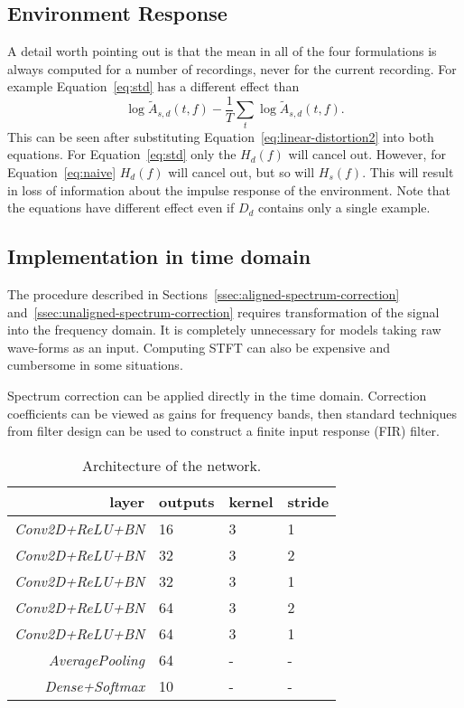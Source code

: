 \documentclass[a4paper]{article}
\newcommand{\va}{A}
\newcommand{\vh}{H}
\newcommand{\vs}{s}
\newcommand{\ff}{f}
\newcommand{\dd}{d}
\newcommand{\ampltf}[1]{\widetilde{\va}_{#1}\left(t,\ff\right)}
\newcommand{\respf}[1]{\vh_{#1}\left(\ff\right)}
\begin{document}
\subsection{Environment Response}
\label{ssec:env-resp}

A detail worth pointing out is that the mean in all of the four formulations is always computed for a number of recordings, never for the current recording. For example Equation~\eqref{eq:std} has a different effect than
\begin{equation}
    \log\ampltf{\vs,\dd} - \frac{1}{T}\sum_{t}\log\ampltf{\vs,\dd}.
    \label{eq:naive}
\end{equation}
This can be seen after substituting Equation~\eqref{eq:linear-distortion2} into both equations. 
For Equation~\eqref{eq:std} only the $\respf{\dd}$ will cancel out. However, for Equation~\eqref{eq:naive} $\respf{\dd}$ will cancel out, but so will $\respf{\vs}$.
This will result in loss of information about the impulse response of the environment.
Note that the equations have different effect even if $D_\dd$ contains only a single example.

\subsection{Implementation in time domain}
\label{ssec:fir}

The procedure described in Sections~\ref{ssec:aligned-spectrum-correction} and~\ref{ssec:unaligned-spectrum-correction} requires transformation of the signal into the frequency domain. It is completely unnecessary for models taking raw wave-forms as an input. Computing STFT can also be expensive and cumbersome in some situations.

Spectrum correction can be applied directly in the time domain. Correction coefficients can be viewed as gains for frequency bands, then standard techniques from filter design can be used to construct a finite input response (FIR) filter.

\begin{table}[t]
\centering
\caption{Architecture of the network.}
\begin{tabular}{@{}rlll@{}}
\toprule
\textbf{layer} & \textbf{outputs} & \textbf{kernel} & \textbf{stride} \\ \midrule
\textit{Conv2D+ReLU+BN} & 16 & 3 & 1 \\
\textit{Conv2D+ReLU+BN} & 32 & 3 & 2 \\
\textit{Conv2D+ReLU+BN} & 32 & 3 & 1 \\
\textit{Conv2D+ReLU+BN} & 64 & 3 & 2 \\
\textit{Conv2D+ReLU+BN} & 64 & 3 & 1 \\
\textit{AveragePooling} & 64 & - & - \\
\textit{Dense+Softmax} & 10 & - & - \\ \bottomrule
\end{tabular}
\label{tab:model}
\end{table}
\end{document}

